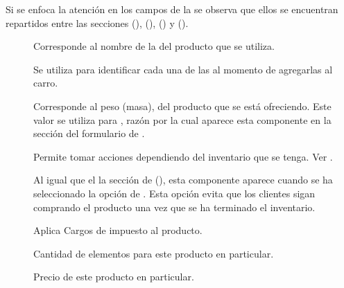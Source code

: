 		Si se enfoca la atención en los campos de la  se observa que ellos se encuentran repartidos entre las secciones \PricingForm(), \InventoryForm(), \ShippingForm() y \VariantsForm().

		\begin{description}
			\item [\LabelForm]
				Corresponde al nombre de la \VariantForm del producto que se utiliza.

			\item [\OptionForm]
				Se utiliza para identificar cada una de las \VariantsForm al momento de agregarlas al carro.

			\item [\WeightForm]
				Corresponde al peso (masa), del producto que se está ofreciendo. Este valor se utiliza para \shipping, razón por la cual aparece esta componente en la sección \ShippingForm del formulario de \shopifyNAME {}.

			\item [\trackingForm]
				Permite tomar acciones dependiendo del inventario que se tenga. Ver .

			\item [\denyForm]
				Al igual que el la sección \InventoryForm de \shopifyNAME(), esta componente aparece cuando se ha seleccionado la opción de \trackingForm. Esta opción evita que los clientes sigan comprando el producto una vez que se ha terminado el inventario.

			\item [\taxableForm]
				Aplica Cargos de impuesto al producto.

			\item [\quantityForm]
				Cantidad de elementos para este producto en particular.

			\item [\priceForm]
				Precio de este producto en particular.
		\end{description}


